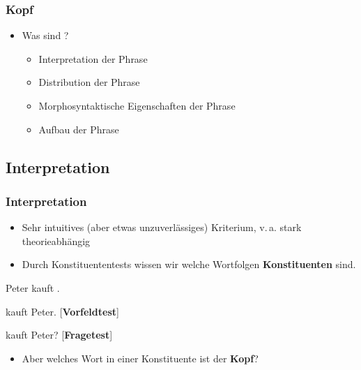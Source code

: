 \begin{frame}
\frametitle{Kopf}

\begin{itemize}
	\item Was sind ?
	\begin{itemize}
		\item Interpretation der Phrase
		\item Distribution der Phrase
		\item Morphosyntaktische Eigenschaften der Phrase
		\item Aufbau der Phrase
		
	\end{itemize}
\end{itemize}

\end{frame}


\subsection{Interpretation}

\begin{frame}
\frametitle{Interpretation}

\begin{itemize}
	\item Sehr intuitives (aber etwas unzuverlässiges) Kriterium, v.\,a. stark theorieabhängig
	\item Durch Konstituententests wissen wir welche Wortfolgen \textbf{Konstituenten} sind.
\end{itemize}
\pause

\ea Peter kauft .

\pause

\ex {} kauft Peter.  \hfill [\textbf{Vorfeldtest}]

\pause

\ex \alertred{{[}Was]} kauft Peter? \ras {} \hfill [\textbf{Fragetest}]
\z

\pause
\begin{itemize}
	\item Aber welches Wort in einer Konstituente ist der \textbf{Kopf}?
\end{itemize} 

\end{frame}


